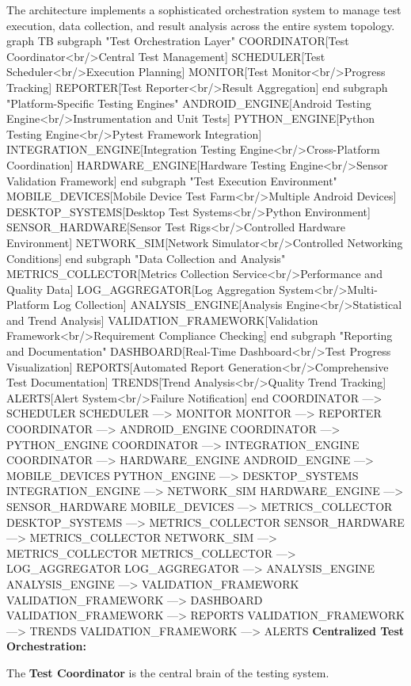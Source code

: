 {{{The architecture implements a sophisticated orchestration system to manage test execution, data collection, and result analysis across the entire system topology. graph TB subgraph "Test Orchestration Layer" COORDINATOR[Test Coordinator<br/>Central Test Management] SCHEDULER[Test Scheduler<br/>Execution Planning] MONITOR[Test Monitor<br/>Progress Tracking] REPORTER[Test Reporter<br/>Result Aggregation] end subgraph "Platform-Specific Testing Engines" ANDROID_ENGINE[Android Testing Engine<br/>Instrumentation and Unit Tests] PYTHON_ENGINE[Python Testing Engine<br/>Pytest Framework Integration] INTEGRATION_ENGINE[Integration Testing Engine<br/>Cross-Platform Coordination] HARDWARE_ENGINE[Hardware Testing Engine<br/>Sensor Validation Framework] end subgraph "Test Execution Environment" MOBILE_DEVICES[Mobile Device Test Farm<br/>Multiple Android Devices] DESKTOP_SYSTEMS[Desktop Test Systems<br/>Python Environment] SENSOR_HARDWARE[Sensor Test Rigs<br/>Controlled Hardware Environment] NETWORK_SIM[Network Simulator<br/>Controlled Networking Conditions] end subgraph "Data Collection and Analysis" METRICS_COLLECTOR[Metrics Collection Service<br/>Performance and Quality Data] LOG_AGGREGATOR[Log Aggregation System<br/>Multi-Platform Log Collection] ANALYSIS_ENGINE[Analysis Engine<br/>Statistical and Trend Analysis] VALIDATION_FRAMEWORK[Validation Framework<br/>Requirement Compliance Checking] end subgraph "Reporting and Documentation" DASHBOARD[Real-Time Dashboard<br/>Test Progress Visualization] REPORTS[Automated Report Generation<br/>Comprehensive Test Documentation] TRENDS[Trend Analysis<br/>Quality Trend Tracking] ALERTS[Alert System<br/>Failure Notification] end COORDINATOR ---> SCHEDULER SCHEDULER ---> MONITOR MONITOR ---> REPORTER COORDINATOR ---> ANDROID_ENGINE COORDINATOR ---> PYTHON_ENGINE COORDINATOR ---> INTEGRATION_ENGINE COORDINATOR ---> HARDWARE_ENGINE ANDROID_ENGINE ---> MOBILE_DEVICES PYTHON_ENGINE ---> DESKTOP_SYSTEMS INTEGRATION_ENGINE ---> NETWORK_SIM HARDWARE_ENGINE ---> SENSOR_HARDWARE MOBILE_DEVICES ---> METRICS_COLLECTOR DESKTOP_SYSTEMS ---> METRICS_COLLECTOR SENSOR_HARDWARE ---> METRICS_COLLECTOR NETWORK_SIM ---> METRICS_COLLECTOR METRICS_COLLECTOR ---> LOG_AGGREGATOR LOG_AGGREGATOR ---> ANALYSIS_ENGINE ANALYSIS_ENGINE ---> VALIDATION_FRAMEWORK VALIDATION_FRAMEWORK ---> DASHBOARD VALIDATION_FRAMEWORK ---> REPORTS VALIDATION_FRAMEWORK ---> TRENDS VALIDATION_FRAMEWORK ---> ALERTS \textbf{Centralized Test Orchestration:}

The \textbf{Test Coordinator}
 is the central brain of the testing system.

}}}

